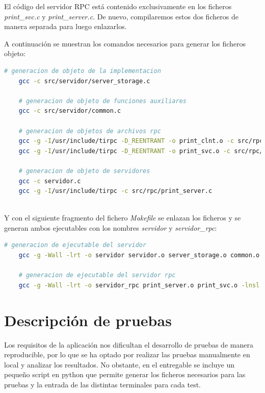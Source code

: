 \documentclass[]{article}
\begin{document}
El código del servidor RPC está contenido exclusivamente en los ficheros \textit{print\_svc.c} y \textit{print\_server.c}. De nuevo, compilaremos estos dos ficheros de manera separada para luego enlazarlos.

A continuación se muestran los comandos necesarios para generar los ficheros objeto:

\begin{center}
  \begin{lstlisting}[caption=Compilación de ficheros en ficheros objetos, language=bash]
    # generacion de objeto de la implementacion
    gcc -c src/servidor/server_storage.c
    
    # generacion de objeto de funciones auxiliares
    gcc -c src/servidor/common.c

    # generacion de objetos de archivos rpc
    gcc -g -I/usr/include/tirpc -D_REENTRANT -o print_clnt.o -c src/rpc/print_clnt.c
    gcc -g -I/usr/include/tirpc -D_REENTRANT -o print_svc.o -c src/rpc/print_svc.c

    # generacion de objeto de servidores
    gcc -c servidor.c
    gcc -g -I/usr/include/tirpc -c src/rpc/print_server.c
    
    \end{lstlisting}
\end{center}

Y con el siguiente fragmento del fichero \textit{Makefile} se enlazan los ficheros y se generan ambos ejecutables con los nombres \textit{servidor} y \textit{servidor\_rpc}:

\begin{center}
  \begin{lstlisting}[caption=Generación de ejecutables, language=bash]
    # generacion de ejecutable del servidor
    gcc -g -Wall -lrt -o servidor servidor.o server_storage.o common.o print_clnt.o -lnsl -lpthread -ldl -ltirpc
    
    # generacion de ejecutable del servidor rpc
    gcc -g -Wall -lrt -o servidor_rpc print_server.o print_svc.o -lnsl -lpthread -ldl -ltirpc

    \end{lstlisting}
\end{center}

\section{Descripción de pruebas}
\label{sec:descripcion_de_pruebas}
Los requisitos de la aplicación nos dificultan el desarrollo de pruebas de manera reproducible, por lo que se ha optado por realizar las pruebas manualmente en local y analizar los resultados. No obstante, en el entregable se incluye un pequeño script en python que permite generar los ficheros necesarios para las pruebas y la entrada de las distintas terminales para cada test. 
\end{document}
